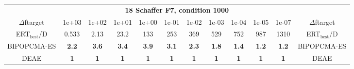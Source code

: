 \begin{tabular}{cccccccccccc}
 & \multicolumn{10}{c}{{\normalsize \textbf{18 Schaffer F7, condition 1000}}}\\
$\Delta$ftarget& 1e+03& 1e+02& 1e+01& 1e+00& 1e-01& 1e-02& 1e-03& 1e-04& 1e-05& 1e-07 & $\Delta$ftarget \\
ERT$_{\textrm{best}}$/D& 0.533& 2.13& 23.2& 133& 253& 369& 529& 752& 987& 1310 & ERT$_{\textrm{best}}$/D \\
\hline
BIPOPCMA-ES & \textbf{2.2} & \textbf{3.6} & \textbf{3.4} & \textbf{3.9} & \textbf{3.1} & \textbf{2.3} & \textbf{1.8} & \textbf{1.4} & \textbf{1.2} & \textbf{1.2} & BIPOPCMA-ES \cite{add_an_entry_for_BIPOPCMA-ES_in_bbob.bib}\\
DEAE & \textbf{1} & \textbf{1} & \textbf{1} & \textbf{1} & \textbf{1} & \textbf{1} & \textbf{1} & \textbf{1} & \textbf{1} & \textbf{1} & DEAE \cite{add_an_entry_for_DEAE_in_bbob.bib}
\end{tabular}
